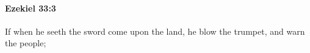 
		\paragraph{Ezekiel 33:3} %
			\label{EZEKIEL-33-3}

			If when he seeth the sword come upon the land, he blow the trumpet, and warn the people;


